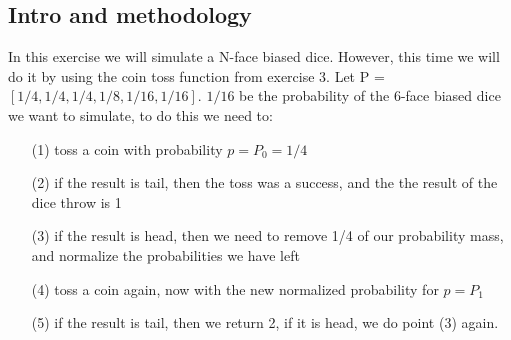 \documentclass[a4paper]{article}
\begin{document}
\subsection*{Intro and methodology}
In this exercise we will simulate a N-face biased dice. However, this time we will do it by using the coin toss function from exercise 3. Let P = $[ 1/4, 1/4, 1/4, 1/8, 1/16, 1/16]$. $1/16$ be the probability of the 6-face biased dice we want to simulate, to do this we need to:\\
\begin{itemize}
\item [(1)] toss a coin with probability $p = P_{0} = 1/4$ 
\item [(2)] if the result is tail, then the toss was a success, and the the result of the dice throw is 1
\item [(3)] if the result is head, then we need to remove 1/4 of our probability mass, and normalize the probabilities we have left
\item [(4)] toss a coin again, now with the new normalized probability for $p = P_{1}$
\item [(5)] if the result is tail, then we return 2, if it is head, we do point (3) again.
\end{itemize}
\end{document}
